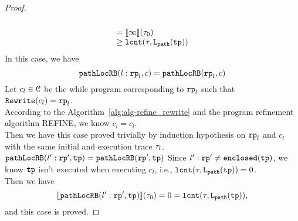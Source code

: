 \begin{proof}
\[\begin{array}{l}
  \\
  =
  \llbracket  \infty  \rrbracket(\mathtt{\tau}_0) 
  \\
  \geq \mathtt{lcnt}(\mathtt{\tau}, \mathtt{L}_{\mathtt{path}}(\mathtt{tp})) 
  \end{array}
  \]
  In this case, we have
  \[
    \mathtt{pathLocRB}(l: \mathtt{rp}_l, c) = \mathtt{pathLocRB}(\mathtt{rp}_l, c)
  \]
  Let $c_l \in \mathcal{C}$ be the while program corresponding to $\mathtt{rp}_l$ such that $\mathtt{Rewrite}(c_l) = \mathtt{rp}_l$.
  \\
  According to the Algorithm~\ref{alg:alg-refine_rewrite} and the program refinement algorithm REFINE, we know
  $c_l = c_l$.
  \\
  Then we have this case proved trivially by induction hypothesis on $\mathtt{rp}_l$ and $c_l$ with the same initial and execution trace $\mathtt{\tau}_l$.
$\mathtt{pathLocRB}(l': \mathtt{rp}', \mathtt{tp}) = \mathtt{pathLocRB}(\mathtt{rp}', \mathtt{tp})$ 
Since $l': \mathtt{rp}' \neq \mathtt{enclosed}(\mathtt{tp})$, we know $\mathtt{tp}$ isn't executed when executing $c_l$, i.e., $\mathtt{lcnt}(\mathtt{\tau}, \mathtt{L}_{\mathtt{path}}(\mathtt{tp})) = 0$.
\\
Then we have
\[
  \llbracket \mathtt{pathLocRB}(l': \mathtt{rp}', \mathtt{tp}) \rrbracket(\mathtt{\tau}_0) = 0 = \mathtt{lcnt}(\mathtt{\tau}, \mathtt{L}_{\mathtt{path}}(\mathtt{tp})),
  \]
and this case is proved.
\end{proof}

